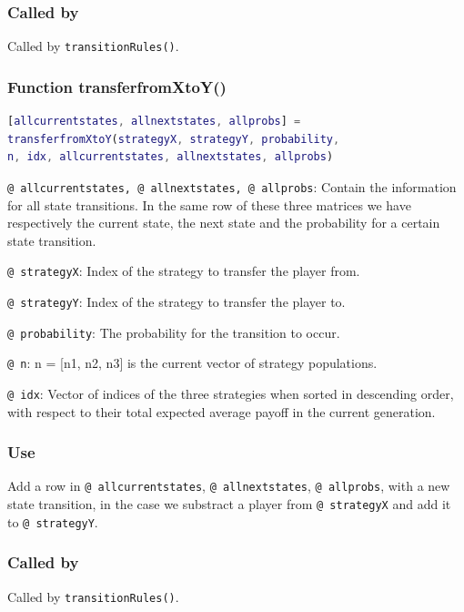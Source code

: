 \documentclass[12pt]{report}
\begin{document}
\subsubsection*{Called by}
Called by \texttt{transitionRules()}.








\subsubsection*{Function transferfromXtoY()}

\begin{lstlisting}[language=Matlab]
[allcurrentstates, allnextstates, allprobs] =
transferfromXtoY(strategyX, strategyY, probability,
n, idx, allcurrentstates, allnextstates, allprobs)

\end{lstlisting}

\texttt{@ allcurrentstates, @ allnextstates, @ allprobs}: Contain the information for all state transitions. In the same row of these three matrices we have respectively the current state, the next state and the probability for a certain state transition.

\texttt{@ strategyX}: Index of the strategy to transfer the player from.

\texttt{@ strategyY}: Index of the strategy to transfer the player to.

\texttt{@ probability}: The probability for the transition to occur.

\texttt{@ n}: n = [n1, n2, n3] is the current vector of strategy populations.

\texttt{@ idx}: Vector of indices of the three strategies when sorted in descending order, with respect to their total expected average payoff in the current generation. 

\subsubsection*{Use}
Add a row in \texttt{@ allcurrentstates}, \texttt{@ allnextstates}, \texttt{@ allprobs}, with a new state transition, in the case we substract a player from \texttt{@ strategyX} and add it to \texttt{@ strategyY}.

\subsubsection*{Called by}
Called by \texttt{transitionRules()}.
\end{document}
